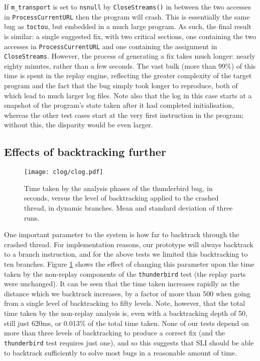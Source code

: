 \documentclass[10pt,twocolumn,preprint,natbib,authoryear]{sigplanconf}
\begin{document}
If \verb|m_transport| is set to \verb|nsnull| by \verb|CloseStreams()|
in between the two accesses in \verb|ProcessCurrentURL| then the
program will crash.  This is essentially the same bug as
\verb|toctou|, but embedded in a much large program.  As such, the
final result is similar: a single suggested fix, with two critical
sections, one containing the two accesses in \verb|ProcessCurrentURL|
and one containing the assignment in \verb|CloseStreams|.  However,
the process of generating a fix takes much longer: nearly eighty
minutes, rather than a few seconds.  The vast bulk (more than 99\%) of
this time is spent in the replay engine, reflecting the greater
complexity of the target program and the fact that the bug simply took
longer to reproduce, both of which lead to much larger log files.
Note also that the log in this case starts at a snapshot of the
program's state taken after it had completed initialisation, whereas
the other test cases start at the very first instruction in the
program; without this, the disparity would be even larger.

\subsection{Effects of backtracking further}
\label{sect:eval:backtrack}

\begin{figure}
\texttt{[image: clog/clog.pdf]}
\caption{Time taken by the analysis phases of the thunderbird bug, in
  seconds, versus the level of backtracking applied to the crashed
  thread, in dynamic branches.  Mean and standard deviation of three
  runs.}
\label{fig:eval:backtrack}
\end{figure}

One important parameter to the system is how far to backtrack through
the crashed thread.  For implementation reasons, our prototype will
always backtrack to a branch instruction, and for the above tests we
limited this backtracking to ten branches.  Figure
\ref{fig:eval:backtrack} shows the effect of changing this parameter
upon the time taken by the non-replay components of the
\verb|thunderbird| test (the replay parts were unchanged).  It can be
seen that the time taken increases rapidly as the distance which we
backtrack increases, by a factor of more than 500 when going from a
single level of backtracking to fifty levels.  Note, however, that the
total time taken by the non-replay analysis is, even with a
backtracking depth of 50, still just 620ms, or 0.013\% of the total
time taken.  None of our tests depend on more than three levels of
backtracking to produce a correct fix (and the \verb|thunderbird| test
requires just one), and so this suggests that SLI should be able to
backtrack sufficiently to solve most bugs in a reasonable amount of
time.
\end{document}

